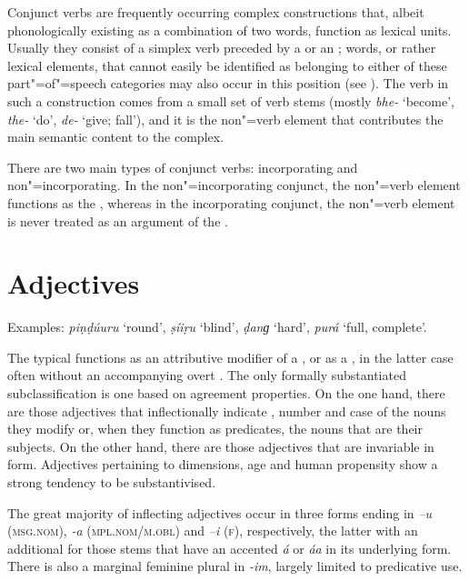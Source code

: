 Conjunct verbs are frequently occurring complex  constructions that, albeit phonologically existing as a combination of two words, function as lexical units. Usually they consist of a simplex verb preceded by a  or an ; words, or rather lexical elements, that cannot easily be identified as belonging to either of these part"=of"=speech categories may also occur in this position (see ). The verb in such a construction comes from a small set of verb stems (mostly \textit{bhe-} `become', \textit{the-} `do', \textit{de-} `give; fall'), and it is the non"=verb element that contributes the main semantic content to the complex.


There are two main types of conjunct verbs: incorporating and non"=incorporating. In the non"=incorporating conjunct, the non"=verb element functions as the , whereas in the incorporating conjunct, the non"=verb element is never treated as an argument of the .

\largerpage[-1]
\section{Adjectives}
\label{sec:3b-4}
Examples: \textit{piṇḍúuru} `round', \textit{ṣíiṛu} `blind', \textit{ḍanɡ} `hard', \textit{purá} `full, complete'.


The typical  functions as an attributive modifier of a , or as a , in the latter case often without an accompanying overt . The only formally substantiated subclassification is one based on agreement properties. On the one hand, there are those adjectives that inflectionally indicate , number and case of the nouns they modify or, when they function as predicates, the nouns that are their subjects. On the other hand, there are those adjectives that are invariable in form. Adjectives pertaining to dimensions, age and human propensity show a strong tendency to be substantivised.


The great majority of inflecting adjectives occur in three forms ending in \textit{–u} (\textsc{msg.nom}),  \textit{-a} (\textsc{mpl.nom/m.obl}) and \textit{–i} (\textsc{f}), respectively, the latter with an additional  for those stems that have an accented \textit{á} or \textit{áa} in its underlying form. There is also a marginal feminine plural in \textit{-im}, largely limited to predicative use.  


